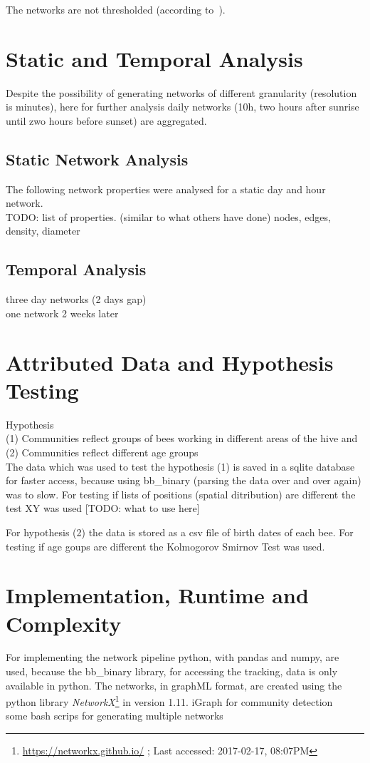 The networks are not thresholded (according to~\cite{farine2015constructing}).

\section{Static and Temporal Analysis}

Despite the possibility of generating networks of different granularity (resolution is minutes), here for further analysis daily networks (10h, two hours after sunrise until zwo hours before sunset) are aggregated.

\subsection{Static Network Analysis}
The following network properties were analysed for a static day and hour network.\\
TODO: list of properties. (similar to what others have done)
nodes, edges, density, diameter\\


\subsection{Temporal Analysis}
three day networks (2 days gap)\\
one network 2 weeks later\\


\section{Attributed Data and Hypothesis Testing}
Hypothesis\\
(1) Communities reflect groups of bees working in different areas of the hive and\\
(2) Communities reflect different age groups\\

The data which was used to test the hypothesis (1) is saved in a sqlite database for faster access, because using bb\_binary (parsing the data over and over again) was to slow. For testing if lists of positions (spatial ditribution) are different the test XY was used [TODO: what to use here]

For hypothesis (2) the data is stored as a csv file of birth dates of each bee. For testing if age goups are different the Kolmogorov Smirnov Test was used.

\section{Implementation, Runtime and Complexity}
For implementing the network pipeline python, with pandas and numpy, are used, because the bb\_binary library, for accessing the tracking, data is only available in python. The networks, in graphML format, are created using the python library \emph{NetworkX}\footnote{\url{https://networkx.github.io/} ; Last accessed: 2017-02-17, 08:07PM} in version 1.11.
iGraph for community detection\\
some bash scrips for generating multiple networks\\

